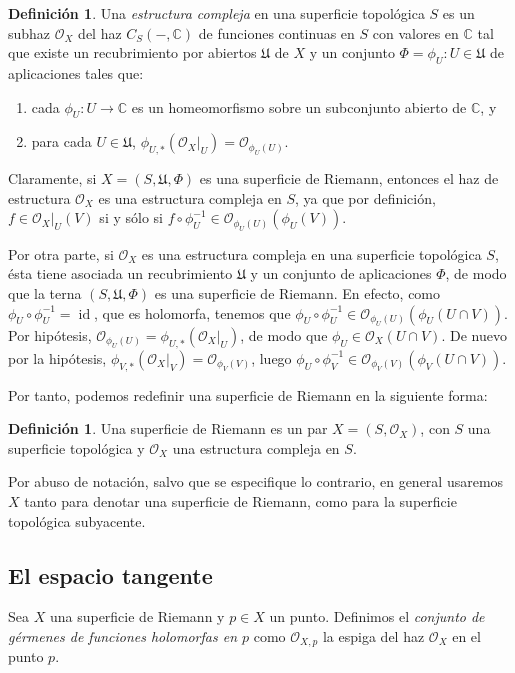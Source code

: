 \documentclass[12pt,a4paper]{article}
\theoremstyle{definition} \newtheorem{defn}[thm]{Definición}
\theoremstyle{definition} \newtheorem{ejemplo}[thm]{Ejemplo}
\theoremstyle{definition} \newtheorem{ejercicio}[thm]{Ejercicio}
\def\CC{\mathbb{C}}
\def\OO{\mathscr{O}}
\DeclareMathOperator{\id}{id}
\begin{document}
\begin{defn}
  Una \emph{estructura compleja} en una superficie topológica $S$ es un subhaz $\OO_X$ del haz $C_S(-,\CC)$ de funciones continuas en $S$ con valores en $\CC$ tal que existe un recubrimiento por abiertos $\mathfrak{U}$ de $X$ y un conjunto $\Phi={\phi_U:U\in \mathfrak{U}}$ de aplicaciones tales que:
  \begin{enumerate}
    \item cada $\phi_U:U\rightarrow \CC$ es un homeomorfismo sobre un subconjunto abierto de $\CC$, y
    \item para cada $U\in \mathfrak{U}$, $\phi_{U,*}(\OO_X|_U)= \OO_{\phi_U(U)}$.
  \end{enumerate}
\end{defn}

Claramente, si $X=(S,\mathfrak{U},\Phi)$ es una superficie de Riemann, entonces el haz de estructura $\OO_X$ es una estructura compleja en $S$, ya que por definición, $f\in \OO_X|_U(V)$ si y sólo si $f\circ \phi_U^{-1} \in \OO_{\phi_U(U)}(\phi_U(V))$.

Por otra parte, si $\OO_X$ es una estructura compleja en una superficie topológica $S$, ésta tiene asociada un recubrimiento $\mathfrak{U}$ y un conjunto de aplicaciones $\Phi$, de modo que la terna $(S,\mathfrak{U},\Phi)$ es una superficie de Riemann. En efecto, como $\phi_U \circ \phi_U^{-1}=\id$, que es holomorfa, tenemos que $\phi_U \circ \phi_U^{-1} \in \OO_{\phi_U(U)}(\phi_U(U\cap V))$. Por hipótesis, $\OO_{\phi_U(U)} = \phi_{U,*}(\OO_X|_U)$, de modo que $\phi_U \in \OO_X(U\cap V)$. De nuevo por la hipótesis, $\phi_{V,*}(\OO_X|_V) = \OO_{\phi_V(V)}$, luego $\phi_U \circ \phi_V^{-1} \in \OO_{\phi_V(V)}(\phi_V(U\cap V))$.

Por tanto, podemos redefinir una superficie de Riemann en la siguiente forma:

\begin{defn}
  Una superficie de Riemann es un par $X=(S,\OO_X)$, con $S$ una superficie topológica y $\OO_X$ una estructura compleja en $S$.
\end{defn}

Por abuso de notación, salvo que se especifique lo contrario, en general usaremos $X$ tanto para denotar una superficie de Riemann, como para la superficie topológica subyacente.

\subsection{El espacio tangente}
Sea $X$ una superficie de Riemann y $p\in X$ un punto. Definimos el \emph{conjunto de gérmenes de funciones holomorfas en $p$} como $\OO_{X,p}$ la espiga del haz $\OO_X$ en el punto $p$.
\end{document}
